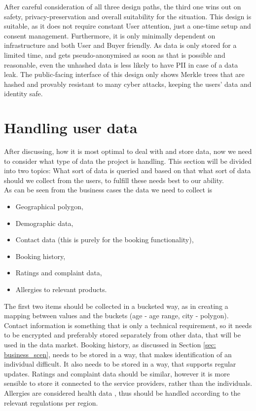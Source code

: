 \documentclass[a4paper,11pt]{report} %
\theoremstyle{change}
\theoremstyle{theoremstyle}
\begin{document}
After careful consideration of all three design paths, the third one wins out on safety, privacy-preservation and overall suitability for the situation. This design is suitable, as it does not require constant User attention, just a one-time setup and consent management. Furthermore, it is only minimally dependent on infrastructure and both User and Buyer friendly. As data is only stored for a limited time, and gets pseudo-anonymised as soon as that is possible and reasonable, even the unhashed data is less likely to have PII in case of a data leak. The public-facing interface of this design only shows Merkle trees that are hashed and provably resistant to many cyber attacks, keeping the users' data and identity safe.

\section{Handling user data}
After discussing, how it is most optimal to deal with and store data, now we need to consider what type of data the project is handling. This section will be divided into two topics: What sort of data is queried and based on that what sort of data should we collect from the users, to fulfill these needs best to our ability.\\
As can be seen from the business cases the data we need to collect is 
\begin{itemize}
    \item Geographical polygon,
    \item Demographic data,
    \item Contact data (this is purely for the booking functionality),
    \item Booking history,
    \item Ratings and complaint data,
    \item Allergies to relevant products.
\end{itemize}
The first two items should be collected in a bucketed way, as in creating a mapping between values and the buckets (age - age range, city - polygon). Contact information is something that is only a technical requirement, so it needs to be encrypted and preferably stored separately from other data, that will be used in the data market. Booking history, as discussed in Section \ref{sec: business_scen}, needs to be stored in a way, that makes identification of an individual difficult. It also needs to be stored in a way, that supports regular updates. Ratings and complaint data should be similar, however it is more sensible to store it connected to the service providers, rather than the individuals. Allergies are considered health data \cite{GDPR2016}, thus should be handled according to the relevant regulations per region.
\end{document}
